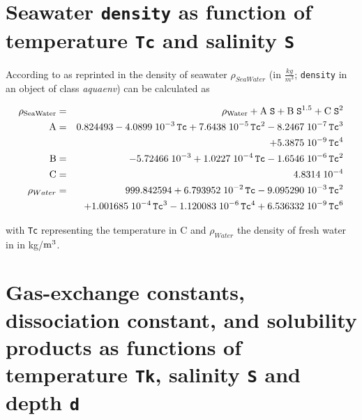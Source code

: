 \documentclass[a4paper]{article}
\begin{document}
\section{Seawater \texttt{density} as function of temperature \texttt{Tc} and salinity \texttt{S}}
According to \citet[1981]{Millero1981} as reprinted in \citet[chap. 5, p. 6f]{DOE1994} the density of seawater $\rho_{SeaWater}$ (in $\frac{kg}{m^3}$; \texttt{density} in an object of class \textit{aquaenv}) can be calculated as

\begin{center}
\begin{eqnarray}
\rm \rho_{SeaWater} &=&\rm \rho_{Water} + A\;\mbox{\texttt{S}} + B\;\mbox{\texttt{S}}^{1.5} + C\; \mbox{\texttt{S}}^2\\ 
\rm A &=& \rm 0.824493 - 4.0899 \; 10^{-3} \, \mbox{\texttt{Tc}} + 7.6438 \; 10^{-5} \, \mbox{\texttt{Tc}}^2 - 8.2467 \; 10^{-7}  \,\mbox{\texttt{Tc}}^3\\
  && \rm + 5.3875 \; 10^{-9} \, \mbox{\texttt{Tc}}^4\\
\rm B &=& \rm -5.72466 \; 10^{-3} + 1.0227 \; 10^{-4} \, \mbox{\texttt{Tc}} - 1.6546\; 10^{-6} \, \mbox{\texttt{Tc}}^2 \\
\rm C &=& 4.8314\;10^{-4} \\
\rho_{Water} &=& 999.842594 + 6.793952\;10^{-2} \, \mbox{\texttt{Tc}} - 9.095290\;10^{-3} \, \mbox{\texttt{Tc}}^2\\
                                    && + 1.001685\;10^{-4}\,\mbox{\texttt{Tc}}^3 - 1.120083\;10^{-6} \, \mbox{\texttt{Tc}}^4 + 6.536332\;10^{-9} \, \mbox{\texttt{Tc}}^6
\end{eqnarray}
\end{center}

with \texttt{Tc} representing the temperature in \textdegree$ $C and $\rho_{Water}$ the density of fresh water in in kg/$\rm m^3$.

\section{Gas-exchange constants, dissociation constant, and solubility products as functions of temperature \texttt{Tk}, salinity \texttt{S} and depth \texttt{d}}
\end{document}
